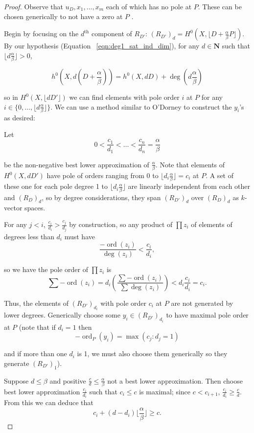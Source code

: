\documentclass{amsart}
\theoremstyle{plain}
\theoremstyle{definition}
\theoremstyle{remark}
\numberwithin{equation}{section}
\DeclareMathOperator{\ord}{ord}
\begin{document}
\begin{proof}
Observe that $u_D,x_1,...,x_m$ each of which has no pole at $P$.
These can be chosen generically to not have a zero at $P$ .

Begin by focusing on the $d^{\text{th}}$ component of $R_{D'}$: $(R_
{D'})_d = H^0(X, \lfloor D + \frac{\alpha}{\beta} P \rfloor)$. By
our hypothesis (Equation ~\ref{eqn:deg1_sat_ind_dim}), for any $d
\in \mathbf{N}$ such that $\lfloor d \frac{ \alpha}{\beta} \rfloor > 0$,

\[
	h^0 (X, d(D+\frac{\alpha}{\beta})) = h^0(X, dD) + \deg(d\frac{\alpha}{\beta})
\]

\noindent
so in $H^0 (X, \lfloor dD' \rfloor)$ we can find elements with pole
order $i$ at $P$ for any $i \in \{0, \ldots, \lfloor d \frac{\alpha}{
\beta} \rfloor \}$. We can use a method similar to O'Dorney to
construct the $y_i$'s as desired: 

Let 
\[
	0 < \frac{c_1}{d_1} < \ldots < \frac{c_n}{d_n} = \frac{\alpha}{
\beta}
\]

\noindent
be the non-negative best lower approximation of $\frac{
\alpha}{\beta}$.  Note that elements of $H^0(X,dD')$ have pole of
orders ranging from 0 to $\lfloor d_i \frac{\alpha}{\beta}\rfloor =
c_i $ at $P$.  A set of these one for each pole degree 1 to $\lfloor
d_i \frac{\alpha}{\beta} \rfloor$ are linearly independent from
each other and $(R_D)_d$, so by degree considerations, they span
$(R_{D'})_d$ over $(R_D)_d$ as $k$-vector spaces. 

For any $j < i$, $\frac{c_i}{d_i} > \frac{c_j}{d_j}$
by construction, so any product of $\prod z_i$ of elements of
degrees less than $d_i$ must have 
\[
	\frac{-\ord(z_i)}{\deg(z_i)} < \frac{c_i}{d _i},
\]

\noindent
so we have the pole order of $\prod z_i$ is 
\[
	\sum -\ord(z_i) = d_i(\frac{\sum -\ord( z_i)}{\sum \deg( z_i)}) < d_i\frac{c_i}{d_i} = c_i .
\]

\noindent
Thus, the elements of $(R_{D'})_{d_i}$ with pole order $c_i$ at $P$ are not generated by 
lower degrees.  
Generically choose some $y_i \in(R_{
D'})_{d_i}$ to have maximal pole order at $P$ (note that if $d_i=1$ then 
\[
	-\ord_P(y_i)= \max(c_j:d_j=1)
\]

\noindent
and if more than one $d_i$ is 1, we
must also choose them generically so they generate $(R_{D'})_1$).

Suppose $d\le \beta$ and positive $\frac{c}{d} \le \frac{\alpha}{
\beta}$ not a best lower approximation.  Then choose
best lower approximation $\frac{c_i}{d_i}$ such that $c_i\le c$ is
maximal; since $c<c_{i+1}$, $\frac{c_i}{d_i}\ge \frac{c}{d}$.  From
this we can deduce that 
\[
	c_i+(d-d_i) \lfloor \frac{\alpha}{\beta} \rfloor \ge c.
\]


\end{proof}
\end{document}
